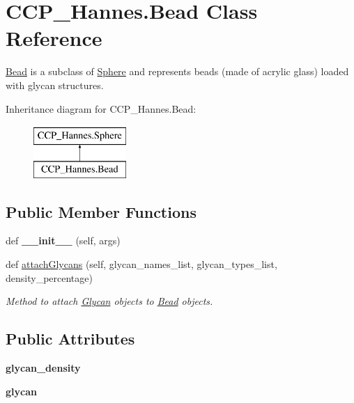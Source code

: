 \hypertarget{class_c_c_p___hannes_1_1_bead}{}\section{C\+C\+P\+\_\+\+Hannes.\+Bead Class Reference}
\label{class_c_c_p___hannes_1_1_bead}


\mbox{\hyperlink{class_c_c_p___hannes_1_1_bead}{Bead}} is a subclass of \mbox{\hyperlink{class_c_c_p___hannes_1_1_sphere}{Sphere}} and represents beads (made of acrylic glass) loaded with glycan structures.  


Inheritance diagram for C\+C\+P\+\_\+\+Hannes.\+Bead\+:\begin{figure}[H]
\begin{center}
\leavevmode
\includegraphics[height=2.000000cm]{class_c_c_p___hannes_1_1_bead}
\end{center}
\end{figure}
\subsection*{Public Member Functions}
\begin{DoxyCompactItemize}
\item 
\mbox{\label{class_c_c_p___hannes_1_1_bead_a240f28f06e51c26dbd73255b1871bfa7}} 
def {\bfseries \+\_\+\+\_\+init\+\_\+\+\_\+} (self, args)
\item 
def \mbox{\hyperlink{class_c_c_p___hannes_1_1_bead_a0da1639096e0bdd18ef542a01b2dab0f}{attach\+Glycans}} (self, glycan\+\_\+names\+\_\+list, glycan\+\_\+types\+\_\+list, density\+\_\+percentage)
\begin{DoxyCompactList}\small\item\em Method to attach \mbox{\hyperlink{class_c_c_p___hannes_1_1_glycan}{Glycan}} objects to \mbox{\hyperlink{class_c_c_p___hannes_1_1_bead}{Bead}} objects. \end{DoxyCompactList}\end{DoxyCompactItemize}
\subsection*{Public Attributes}
\begin{DoxyCompactItemize}
\item 
\mbox{\label{class_c_c_p___hannes_1_1_bead_aab2ee2d3ff67f268fbee3c3d53b6e24d}} 
{\bfseries glycan\+\_\+density}
\item 
\mbox{\label{class_c_c_p___hannes_1_1_bead_a36e304460dd84f029c201d13a56cb590}} 
{\bfseries glycan}
\end{DoxyCompactItemize}


